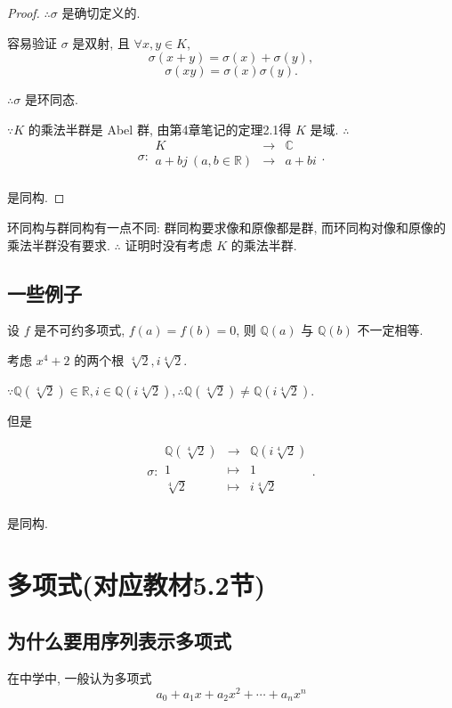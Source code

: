 \documentclass[UTF8]{ctexart}
\begin{document}
\begin{proof}
    $\therefore\sigma$ 是确切定义的.

    容易验证 $\sigma$ 是双射, 且 $\forall x,y\in K$,
    \[\sigma(x+y)=\sigma(x)+\sigma(y),\]
    \[\sigma(xy)=\sigma(x)\sigma(y).\]

    $\therefore\sigma$ 是环同态.

    $\because K$ 的乘法半群是 Abel 群, 由第4章笔记的定理2.1得 $K$ 是域. $\therefore$
    \[\sigma:\begin{array}{rcl}
        K & \to & \mathbb{C} \\
        a+bj\ (a,b\in\mathbb{R}) & \to & a+bi \\
    \end{array}.\]

    是同构.
\end{proof}
\begin{note}
    环同构与群同构有一点不同: 群同构要求像和原像都是群, 而环同构对像和原像的乘法半群没有要求. $\therefore$ 证明时没有考虑 $K$ 的乘法半群.
\end{note}
\subsection{一些例子}
\begin{example}
    设 $f$ 是不可约多项式, $f(a)=f(b)=0$, 则 $\mathbb{Q}(a)$ 与 $\mathbb{Q}(b)$ 不一定相等.

    考虑 $x^4+2$ 的两个根 $\sqrt[4]{2},i\sqrt[4]{2}$.

    $\because\mathbb{Q}(\sqrt[4]{2})\in\mathbb{R},i\in\mathbb{Q}(i\sqrt[4]{2}),\therefore\mathbb{Q}(\sqrt[4]{2})\neq\mathbb{Q}(i\sqrt[4]{2})$.

    但是

    \[\sigma:\begin{array}{rcl}
        \mathbb{Q}(\sqrt[4]{2}) & \to & \mathbb{Q}(i\sqrt[4]{2}) \\
        1 & \mapsto & 1 \\
        \sqrt[4]{2} & \mapsto & i\sqrt[4]{2} \\
    \end{array}.\]

    是同构.
\end{example}
\section{多项式(对应教材5.2节)}
\subsection{为什么要用序列表示多项式}
在中学中, 一般认为多项式
\begin{equation}\label{eq2.1}
    a_0+a_1x+a_2x^2+\cdots+a_nx^n
\end{equation}
\end{document}
